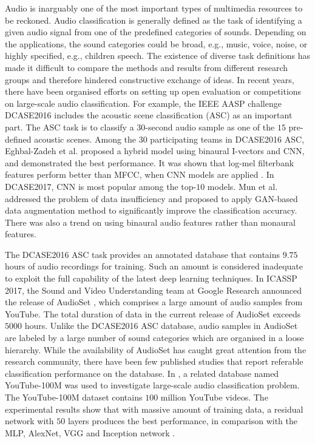 \documentclass{article}
\begin{document}
Audio is inarguably one of the most important types of multimedia resources to be reckoned. Audio classification is generally defined as the task of identifying a given audio signal from one of the predefined categories of sounds. Depending on the applications, the sound categories could be broad, e.g., music, voice, noise, or highly specified, e.g., children speech. The existence of diverse task definitions has made it difficult to compare the methods and results from different research groups and therefore hindered constructive exchange of ideas. In recent years, there have been organised efforts on setting up open evaluation or competitions on large-scale audio classification. For example, the IEEE AASP challenge DCASE2016 includes the acoustic scene classification (ASC) as an important part. The ASC task is to classify a $30$-second audio sample as one of the $15$ pre-defined acoustic scenes. Among the $30$ participating teams in DCASE2016 ASC, Eghbal-Zadeh et al. \cite{Eghbal-Zadeh2016} proposed a hybrid model using binaural I-vectors and CNN, and demonstrated the best performance. It was shown that log-mel filterbank features perform better than MFCC, when CNN models are applied \cite{Valenti2016}. In DCASE2017, CNN is most popular among the top-$10$ models. Mun et al. \cite{Mun2017} addressed the problem of data insufficiency and proposed to apply GAN-based data augmentation method to significantly improve the classification accuracy. There was also a trend on using binaural audio features rather than monaural features.

The DCASE2016 ASC task provides an annotated database that contains $9.75$ hours of audio recordings for training. Such an amount is considered inadequate to exploit the full capability of the latest deep learning techniques. In ICASSP 2017, the Sound and Video Understanding team at Google Research announced the release of AudioSet \cite{audioset2017ontology}, which comprises a large amount of audio samples from YouTube. The total duration of data in the current release of AudioSet exceeds $5000$ hours. Unlike the DCASE2016 ASC database, audio samples in AudioSet are labeled by a large number of sound categories which are organised in a loose hierarchy. While the availability of AudioSet has caught great attention from the research community, there have been few published studies that report referable classification performance on the database. In \cite{googlecnnaudioclass}, a related database named YouTube-100M was used to investigate large-scale audio classification problem. The YouTube-100M dataset contains $100$ million YouTube videos. The experimental results show that with massive amount of training data, a residual network with $50$ layers produces the best performance, in comparison with the MLP, AlexNet, VGG and Inception network \cite{googlecnnaudioclass}.
\end{document}
